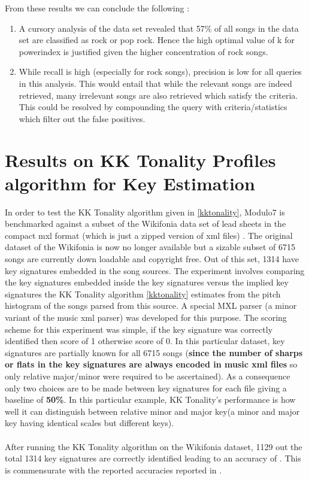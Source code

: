 From these results we can conclude the following : 

\begin{enumerate}
\item A cursory analysis of the data set revealed that 57\% of all songs in the data set are classified as rock or pop rock. Hence the high optimal value of k for powerindex is justified given the higher concentration of rock songs. 
\item While recall is high (especially for rock songs), precision is low for all queries in this analysis. This would entail that while the relevant songs are indeed retrieved, many irrelevant songs are also retrieved which satisfy the criteria. This could be resolved by compounding the query with criteria/statistics which filter out the false positives. 
\end{enumerate}

\section{Results on KK Tonality Profiles algorithm for Key Estimation} \label{kktonalexpt}

\noindent In order to test the KK Tonality algorithm given in \ref{kktonality}, Modulo7 is benchmarked against a subset of the Wikifonia data set of lead sheets in the compact mxl format (which is just a zipped version of xml files) \cite{WikifoniaDataset}. The original dataset of the Wikifonia is now no longer available but a sizable subset of 6715 songs are currently down loadable and copyright free. Out of this set, 1314 have key signatures embedded in the song sources. The experiment involves comparing the key signatures embedded inside the key signatures versus the implied key signatures the KK Tonality algorithm \ref{kktonality} estimates from the pitch histogram of the songs parsed from this source. A special MXL parser (a minor variant of the music xml parser) was developed for this purpose. The scoring scheme for this experiment was simple, if the key signature was correctly identified then score of 1 otherwise score of 0. In this particular dataset, key signatures are partially known for all 6715 songs (\textbf{since the number of sharps or flats in the key signatures are always encoded in music xml files} so only relative major/minor were required to be ascertained). As a consequence only two choices are to be made between key signatures for each file giving a baseline of \textbf{50\%}. In this particular example, KK Tonality's performance is how well it can distinguish between relative minor and major key(a minor and major key having identical scales but different keys). \\\\
After running the KK Tonality algorithm on the Wikifonia dataset, 1129 out the total 1314 key signatures are correctly identified leading to an accuracy of . This is commensurate with the reported accuracies reported in \cite{kkTonalityKeyFinding}. 

